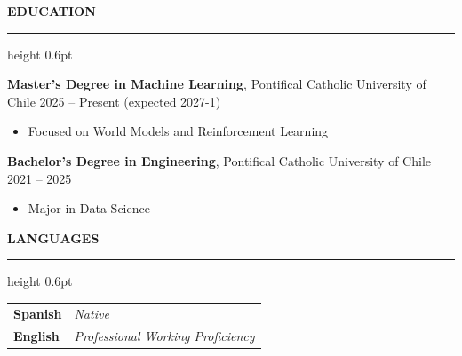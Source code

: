 \documentclass[10pt,a4paper]{article}
\newcommand{\cvsection}[1]{%
    \vspace{10pt}%
    {\large\textbf{\MakeUppercase{#1}}}%
    \vspace{3pt}%
    \hrule height 0.6pt%
    \vspace{6pt}%
}
\begin{document}
\cvsection{Education}

\textbf{Master’s Degree in Machine Learning}, Pontifical Catholic University of Chile \hfill 2025 -- Present (expected 2027-1)
\begin{itemize}
    \item Focused on World Models and Reinforcement Learning
\end{itemize}

\vspace{6pt}
\textbf{Bachelor’s Degree in Engineering}, Pontifical Catholic University of Chile \hfill 2021 -- 2025
\begin{itemize}
    \item Major in Data Science
\end{itemize}

\cvsection{Languages}
\begin{tabular}{@{}p{3cm}l@{}}
\textbf{Spanish} & \textit{Native} \\
\textbf{English} & \textit{Professional Working Proficiency} \\
\end{tabular}
\end{document}
